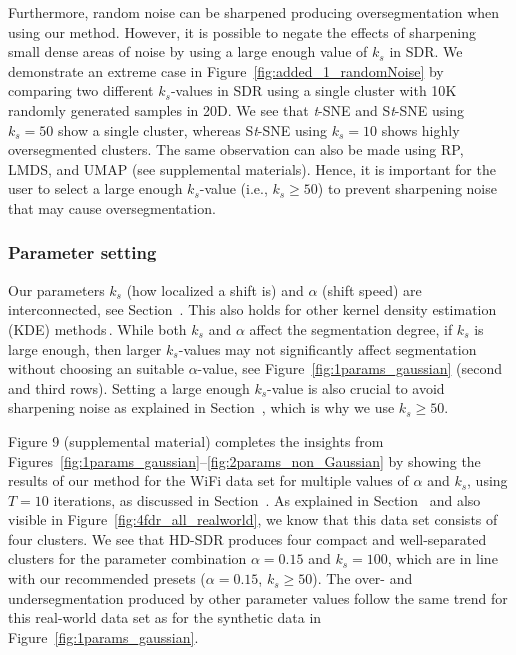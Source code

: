 \documentclass[sagev,Afour,times]{sagej}
\begin{document}
Furthermore, random noise can be sharpened producing oversegmentation when using our method. However, it is possible to negate the effects of sharpening small dense areas of noise by using a large enough value of $k_s$ in SDR. We demonstrate an extreme case in Figure~\ref{fig:added_1_randomNoise} by comparing two different $k_s$-values in SDR using a single cluster with 10$\mathrm{K}$ randomly generated samples in 20D. We see that \emph{t}-SNE and S\emph{t}-SNE using $k_s=50$ show a single cluster, whereas S\emph{t}-SNE using $k_s=10$ shows highly oversegmented clusters. The same observation can also be made using RP, LMDS, and UMAP (see supplemental materials). Hence, it is important for the user to select a large enough $k_s$-value (i.e., $k_s \geq 50$) to prevent sharpening noise that may cause oversegmentation.

\subsubsection{Parameter setting}
\label{sec:discussion:parameters}
%
Our parameters $k_s$ (how localized a shift is) and $\alpha$ (shift speed) are interconnected, see Section~. This also holds for other kernel density estimation (KDE) methods\,\cite{alex1}. While both $k_s$ and $\alpha$ affect the segmentation degree, if $k_s$ is large enough, then larger $k_s$-values may not significantly affect segmentation without choosing an suitable $\alpha$-value, see Figure~\ref{fig:1params_gaussian} (second and third rows). Setting a large enough $k_s$-value is also crucial to avoid sharpening noise as explained in Section~, which is why we use $k_s \geq 50$.

Figure 9 (supplemental material) completes the insights from Figures~\ref{fig:1params_gaussian}--\ref{fig:2params_non_Gaussian} by showing the results of our method for the WiFi data set for multiple values of $\alpha$ and $k_s$, using $T=10$ iterations, as discussed in Section~. As explained in Section~ and also visible in Figure~\ref{fig:4fdr_all_realworld}, we know that this data set consists of four clusters. We see that HD-SDR produces four compact and well-separated clusters for the parameter combination $\alpha=0.15$ and $k_s=100$, which are in line with our recommended presets ($\alpha=0.15$, $k_s \geq 50$). The over- and undersegmentation produced by other parameter values follow the same trend for this real-world data set as for the synthetic data in Figure~\ref{fig:1params_gaussian}.
\end{document}
